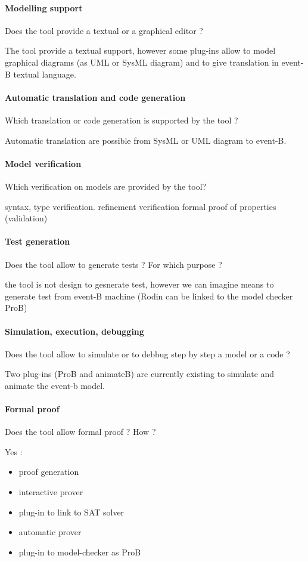 \paragraph{Modelling support}
Does the tool provide a  textual or a graphical editor ?

The tool provide a textual support, however some plug-ins allow to  model graphical diagrams (as UML or SysML diagram) and to give translation in event-B textual language.

\paragraph{Automatic translation and code generation}
Which translation or code generation is supported by the tool ?

Automatic translation are possible from SysML  or UML diagram to event-B.

\paragraph{Model verification}
Which verification on models are provided by the tool?

syntax, type verification.
refinement verification
formal proof of properties (validation)

\paragraph{Test generation}
Does the tool allow to generate tests ? For  which purpose ?

the tool is not design to gesnerate test, however we can imagine means to  generate test from event-B machine (Rodin can be linked to the model checker ProB)

\paragraph{Simulation, execution, debugging}
Does the tool allow to simulate or to debbug step by step a model or a code ?

Two plug-ins (ProB and animateB) are currently existing to simulate and animate the event-b model.

\paragraph{Formal proof}
Does the tool allow formal proof ?  How ?

Yes : 
\begin{itemize}
\item proof generation
\item interactive prover
\item  plug-in to link to SAT solver
\item automatic prover
\item plug-in to model-checker as ProB
\end{itemize}


